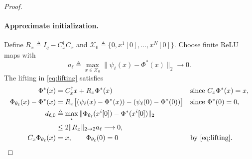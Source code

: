 \documentclass{l4dc2027}
\newcommand{\eqdef}{\triangleq}
\begin{document}
\begin{proof}
\paragraph{Approximate initialization.}
Define \mbox{$R_x\eqdef I_q-C_x^\dagger C_x$} and \mbox{$\mathcal X_0\eqdef\{0,x^1[0],\ldots,x^N[0]\}$}.
Choose finite ReLU maps with
\[
 a_\ell\eqdef\max_{x\in\mathcal X_0}\|\psi_\ell(x)-\Phi^*(x)\|_2
 \longrightarrow0.
\]
The lifting in \eqref{eq:lifting} satisfies
\[
 \begin{aligned}
 \Phi^*(x)&=C_x^\dagger x+R_x\Phi^*(x)
 &&\text{since }C_x\Phi^*(x)=x,\\
 \Phi_{\theta_\ell}(x)-\Phi^*(x)
 &=R_x\bigl[(\psi_\ell(x)-\Phi^*(x))
             -(\psi_\ell(0)-\Phi^*(0))\bigr]
 &&\text{since }\Phi^*(0)=0,\\
 d_{\ell,0}&\eqdef\max_i
 \|\Phi_{\theta_\ell}(x^i[0])-\Phi^*(x^i[0])\|_2\\
 &\le2\|R_x\|_{2\to2}a_\ell\longrightarrow0,\\
 C_x\Phi_{\theta_\ell}(x)&=x,
 \qquad\Phi_{\theta_\ell}(0)=0
 &&\text{by \eqref{eq:lifting}}.
 \end{aligned}
\]


\end{proof}
\end{document}
